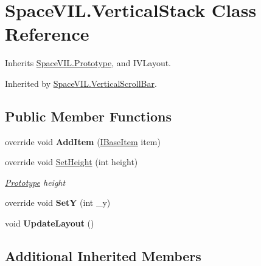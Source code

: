 \hypertarget{class_space_v_i_l_1_1_vertical_stack}{}\section{Space\+V\+I\+L.\+Vertical\+Stack Class Reference}
\label{class_space_v_i_l_1_1_vertical_stack}


Inherits \mbox{\hyperlink{class_space_v_i_l_1_1_prototype}{Space\+V\+I\+L.\+Prototype}}, and I\+V\+Layout.



Inherited by \mbox{\hyperlink{class_space_v_i_l_1_1_vertical_scroll_bar}{Space\+V\+I\+L.\+Vertical\+Scroll\+Bar}}.

\subsection*{Public Member Functions}
\begin{DoxyCompactItemize}
\item 
\mbox{\label{class_space_v_i_l_1_1_vertical_stack_ada632b0ed9e6e9518c8f0054eb0be1ce}} 
override void {\bfseries Add\+Item} (\mbox{\hyperlink{interface_space_v_i_l_1_1_core_1_1_i_base_item}{I\+Base\+Item}} item)
\item 
override void \mbox{\hyperlink{class_space_v_i_l_1_1_vertical_stack_a1e2360b005a6fb8e503dc60d27f1f021}{Set\+Height}} (int height)
\begin{DoxyCompactList}\small\item\em \mbox{\hyperlink{class_space_v_i_l_1_1_prototype}{Prototype}} height \end{DoxyCompactList}\item 
\mbox{\label{class_space_v_i_l_1_1_vertical_stack_a01db47bbec9d8b0629b0c40c51a81710}} 
override void {\bfseries SetY} (int \+\_\+y)
\item 
\mbox{\label{class_space_v_i_l_1_1_vertical_stack_a5d72bb6cbbe27b498e62bc1c9ff02c2c}} 
void {\bfseries Update\+Layout} ()
\end{DoxyCompactItemize}
\subsection*{Additional Inherited Members}


